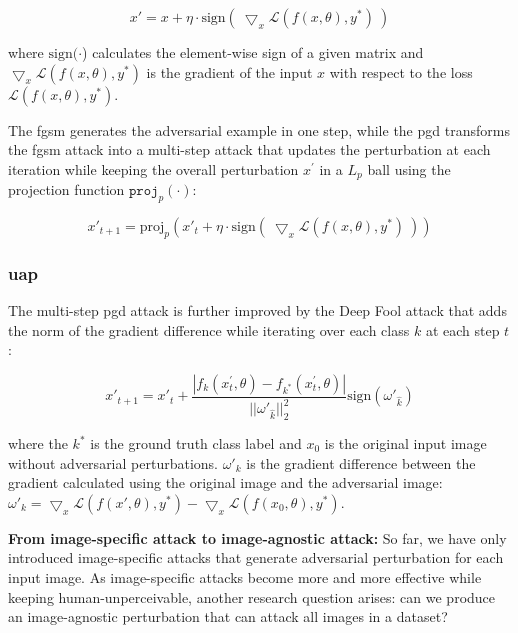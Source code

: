 \begin{equation}
x' = x + \eta \cdot \text{sign}(\ \bigtriangledown_x \mathcal{L}(f(x, \theta), y^*)\ )    
\end{equation} 

where $\text{sign}(\cdot$) calculates the element-wise sign of a given matrix and $\bigtriangledown_x \mathcal{L}(f(x, \theta), y^*)$ is the gradient of the input $x$ with respect to the loss $\mathcal{L}(f(x, \theta), y^*)$.

The \acrshort{fgsm} generates the adversarial example in one step, while the \acrfull{pgd} \citep{madry2017towards} transforms the \acrshort{fgsm} attack into a multi-step attack that updates the perturbation at each iteration while keeping the overall perturbation $x^{'}$ in a $L_p$ ball using the projection function $\texttt{proj}_{p}(\cdot)$:

\begin{equation}
x'_{t+1} = \text{proj}_{p}(x'_t + \eta \cdot \text{sign}(\ \bigtriangledown_x \mathcal{L}(f(x, \theta), y^*)\ ))
\end{equation}


\subsubsection{\acrfull{uap}}

The multi-step \acrshort{pgd} attack is further improved by the Deep Fool attack \citep{moosavidezfooli2016deepfool} that adds the norm of the gradient difference while iterating over each class $k$ at each step $t$:

\begin{equation}
x'_{t+1} = x'_t + \frac{|f_k(x^{'}_{t}, \theta) - f_{k^{*}}(x^{'}_{t}, \theta)|}{||\omega'_{\hat{k}}||^2_2} \text{sign}(\omega'_{\hat{k}})
\end{equation}

where the $k^*$ is the ground truth class label and $x_0$ is the original input image without adversarial perturbations. $\omega'_k$ is the gradient difference between the gradient calculated using the original image and the adversarial image:  $\omega'_k = \bigtriangledown_x \mathcal{L}(f(x', \theta), y^*) - \bigtriangledown_x \mathcal{L}(f(x_0, \theta), y^*)$.

\textbf{From image-specific attack to image-agnostic attack:} So far, we have only introduced image-specific attacks that generate adversarial perturbation for each input image. As image-specific attacks become more and more effective while keeping human-unperceivable, another research question arises: can we produce an image-agnostic perturbation that can attack all images in a dataset?

